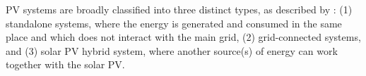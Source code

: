 \documentclass[journal]{IEEEtran}
\begin{document}
PV systems are broadly classified into three distinct types, as described by \cite{Mohanty}: (1) standalone systems, where the energy is generated and consumed in the same place and which does not interact with the main grid, (2) grid-connected systems, and (3) solar PV hybrid system, where another source(s) of energy can work together with the solar PV. %
%
 
\end{document}
